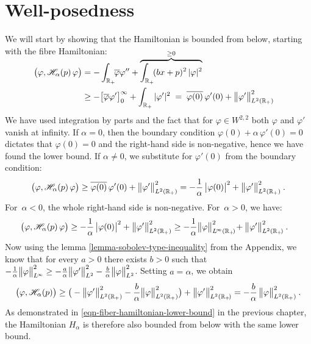 \section{Well-posedness}
We will start by showing that the Hamiltonian is bounded from below, starting with the fibre Hamiltonian:
\begin{align*}
    \\[-2\baselineskip]
    \big( \varphi, \mathscr{H}_\alpha(p) \, \varphi \big)
    &= - \int_{\mathbb{R}_+} \!\! \overline\varphi \varphi''
    + \overbrace{\int_{\mathbb{R}_+} \! (bx + p)^2 \, |\varphi|^2}^{\geq 0}
    \\
    &\geq -\big[ \overline\varphi \varphi' \big]_0^{\infty}
    + \int_{\mathbb{R}_+} |\varphi'|^2
    \;=\;
    \overline{ \varphi(0) } \, \varphi'(0)
    + \big\lVert  \varphi'  \big\rVert_{L^2(\mathbb{R}_+)}^2
\end{align*}
We have used integration by parts and the fact that for $\varphi \in W^{2,2}$ both $\varphi$ and $\varphi'$ vanish at infinity. If $\alpha=0$, then the boundary condition $\varphi(0) + \alpha \, \varphi'(0) = 0$ dictates that $\varphi(0)=0$ and the right-hand side is non-negative, hence we have found the lower bound. If $\alpha \neq 0$, we substitute for $\varphi'(0)$ from the boundary condition:
\begin{align*}
    \big( \varphi, \mathscr{H}_\alpha(p) \, \varphi \big)
    \geq \overline{ \varphi(0) } \, \varphi'(0)
    + \big\lVert  \varphi'  \big\rVert_{L^2(\mathbb{R}_+)}^2
    = - \frac{1}{\alpha} \, \big| \varphi(0) \big|^2
    + \big\lVert  \varphi'  \big\rVert_{L^2(\mathbb{R}_+)}^2
    \: .
\end{align*}
For~$\alpha < 0$, the whole right-hand side is non-negative. For~$\alpha > 0$, we have:
\begin{align*}
    &\big( \varphi, \mathscr{H}_\alpha(p) \, \varphi \big)
    \geq - \frac{1}{\alpha} \, \big| \varphi(0) \big|^2
    + \big\lVert  \varphi'  \big\rVert_{L^2(\mathbb{R}_+)}^2
    \geq -\frac{1}{\alpha} \big\lVert \varphi \big\rVert_{L^{\!\infty}(\mathbb{R}_+\!)}^2
    \! + \big\lVert  \varphi'  \big\rVert_{L^2(\mathbb{R}_+\!)}^2
    \: .
\end{align*}
Now using the lemma \ref{lemma-sobolev-type-inequality} from the Appendix, we know that for every $a>0$ there exists $b>0$ such that $-\frac{1}{\alpha} \big\lVert \varphi \big\rVert_{L^{\!\infty}}^2 \geq -\frac{a}{\alpha} \big\lVert \varphi' \big\rVert_{L^2}^2 - \frac{b}{\alpha} \big\lVert \varphi \big\rVert_{L^2}^2$. Setting $a = \alpha$, we obtain
\begin{equation*}
    \big( \varphi, \mathscr{H}_\alpha(p) \big)
    \geq \big(
        -\big\lVert \varphi' \big\rVert_{L^2(\mathbb{R}_+)}^2
        - \frac{b}{\alpha} \big\lVert \varphi \big\rVert_{L^2(\mathbb{R}_+)}^2
    \big)
     + \big\lVert  \varphi'  \big\rVert_{L^2(\mathbb{R}_+\!)}^2
    =
    - \frac{b}{\alpha} \,
    \big\lVert \varphi \big\rVert_{L^2(\mathbb{R}_+)}^2
    \: .
\end{equation*}
As demonstrated in \eqref{eqn-fiber-hamiltonian-lower-bound} in the previous chapter, the Hamiltonian $H_\alpha$ is therefore also bounded from below with the same lower bound.

